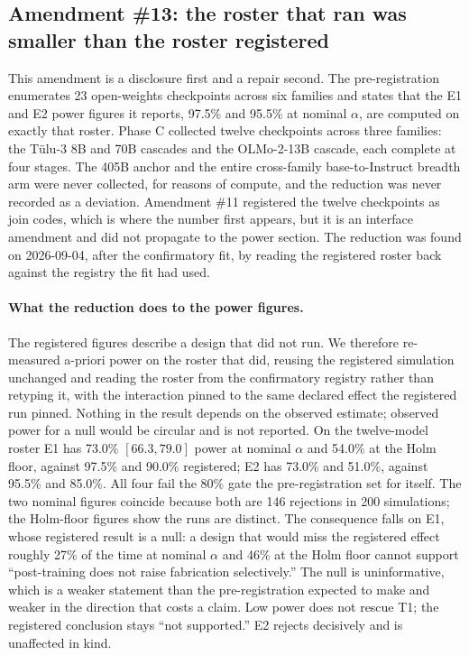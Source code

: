 \subsection{Amendment \#13: the roster that ran was smaller than the roster registered}

This amendment is a disclosure first and a repair second. The pre-registration
enumerates 23 open-weights checkpoints across six families and states that the
E1 and E2 power figures it reports, 97.5\% and 95.5\% at nominal $\alpha$, are
computed on exactly that roster. Phase C collected twelve checkpoints across
three families: the Tülu-3 8B and 70B cascades and the OLMo-2-13B cascade, each
complete at four stages. The 405B anchor and the entire cross-family
base-to-Instruct breadth arm were never collected, for reasons of compute, and
the reduction was never recorded as a deviation. Amendment \#11 registered the
twelve checkpoints as join codes, which is where the number first appears, but
it is an interface amendment and did not propagate to the power section. The
reduction was found on 2026-09-04, after the confirmatory fit, by reading the
registered roster back against the registry the fit had used.

\paragraph{What the reduction does to the power figures.}
The registered figures describe a design that did not run. We therefore
re-measured a-priori power on the roster that did, reusing the registered
simulation unchanged and reading the roster from the confirmatory registry
rather than retyping it, with the interaction pinned to the same declared
effect the registered run pinned. Nothing in the result depends on the observed
estimate; observed power for a null would be circular and is not reported. On
the twelve-model roster E1 has 73.0\% $[66.3, 79.0]$ power at nominal $\alpha$
and 54.0\% at the Holm floor, against 97.5\% and 90.0\% registered; E2 has
73.0\% and 51.0\%, against 95.5\% and 85.0\%. All four fail the 80\% gate the
pre-registration set for itself. The two nominal figures coincide because both
are 146 rejections in 200 simulations; the Holm-floor figures show the runs are
distinct. The consequence falls on E1, whose registered result is a null: a
design that would miss the registered effect roughly 27\% of the time at nominal
$\alpha$ and 46\% at the Holm floor cannot support ``post-training does not
raise fabrication selectively.'' The null is uninformative, which is a weaker
statement than the pre-registration expected to make and weaker in the
direction that costs a claim. Low power does not rescue T1; the registered
conclusion stays ``not supported.'' E2 rejects decisively and is unaffected in
kind.

